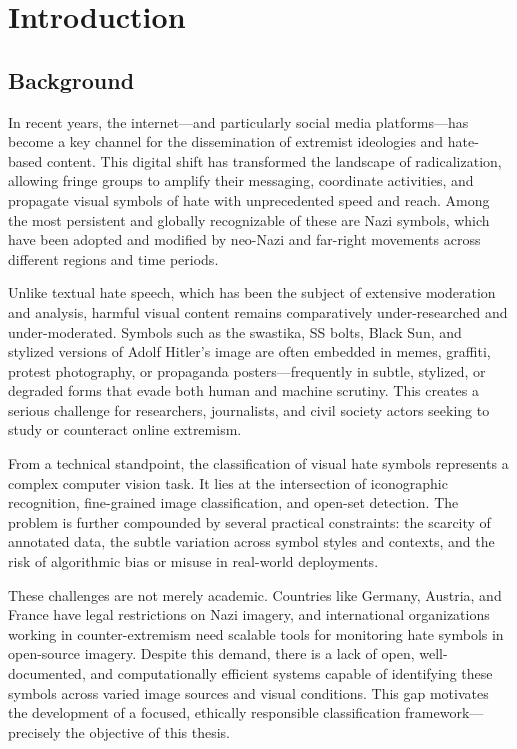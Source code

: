 
\chapter{Introduction}\label{chapter:introduction}
\section{Background}

In recent years, the internet—and particularly social media platforms—has become a key channel for the dissemination
of extremist ideologies and hate-based content. This digital shift has transformed the landscape of radicalization,
allowing fringe groups to amplify their messaging, coordinate activities, and propagate visual symbols of hate with
unprecedented speed and reach. Among the most persistent and globally recognizable of these are Nazi symbols, which
have been adopted and modified by neo-Nazi and far-right movements across different regions and time periods.

Unlike textual hate speech, which has been the subject of extensive moderation and analysis, harmful visual content
remains comparatively under-researched and under-moderated. Symbols such as the swastika, SS bolts, Black Sun, and
stylized versions of Adolf Hitler’s image are often embedded in memes, graffiti, protest photography, or propaganda
posters—frequently in subtle, stylized, or degraded forms that evade both human and machine scrutiny. This creates a
serious challenge for researchers, journalists, and civil society actors seeking to study or counteract online
extremism.

From a technical standpoint, the classification of visual hate symbols represents a complex computer vision task. It
lies at the intersection of iconographic recognition, fine-grained image classification, and open-set detection. The
problem is further compounded by several practical constraints: the scarcity of annotated data, the subtle variation
across symbol styles and contexts, and the risk of algorithmic bias or misuse in real-world deployments.

These challenges are not merely academic. Countries like Germany, Austria, and France have legal restrictions on
Nazi imagery, and international organizations working in counter-extremism need scalable tools for monitoring hate
symbols in open-source imagery. Despite this demand, there is a lack of open, well-documented, and computationally
efficient systems capable of identifying these symbols across varied image sources and visual conditions. This gap
motivates the development of a focused, ethically responsible classification framework—precisely the objective of
this thesis.

